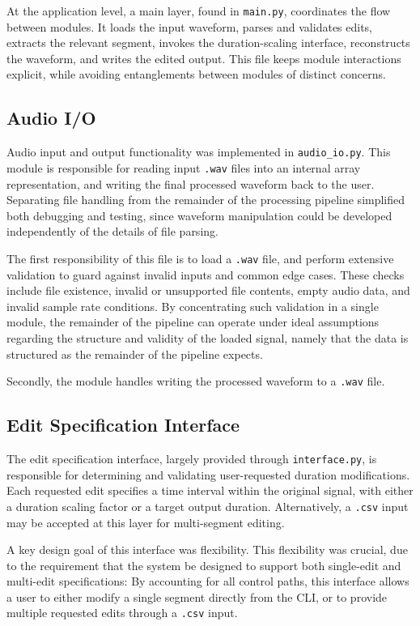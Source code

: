\documentclass{article}
\begin{document}
At the application level, a main layer, found in \texttt{main.py}, coordinates the flow between modules. It loads the input waveform, parses and validates edits, extracts the relevant segment, invokes the duration-scaling interface, reconstructs the waveform, and writes the edited output. This file keeps module interactions explicit, while avoiding entanglements between modules of distinct concerns.

\subsection{Audio I/O}

Audio input and output functionality was implemented in \texttt{audio\_io.py}. This module is responsible for reading input \texttt{.wav} files into an internal array representation, and writing the final processed waveform back to the user. Separating file handling from the remainder of the processing pipeline simplified both debugging and testing, since waveform manipulation could be developed independently of the details of file parsing.

The first responsibility of this file is to load a \texttt{.wav} file, and perform extensive validation to guard against invalid inputs and common edge cases. These checks include file existence, invalid or unsupported file contents, empty audio data, and invalid sample rate conditions. By concentrating such validation in a single module, the remainder of the pipeline can operate under ideal assumptions regarding the structure and validity of the loaded signal, namely that the data is structured as the remainder of the pipeline expects.

Secondly, the module handles writing the processed waveform to a \texttt{.wav} file. 

\subsection{Edit Specification Interface}

The edit specification interface, largely provided through \texttt{interface.py}, is responsible for determining and validating user-requested duration modifications. Each requested edit specifies a time interval within the original signal, with either a duration scaling factor or a target output duration. Alternatively, a \texttt{.csv} input may be accepted at this layer for multi-segment editing.

A key design goal of this interface was flexibility. This flexibility was crucial, due to the requirement that the system be designed to support both single-edit and multi-edit specifications: By accounting for all control paths, this interface allows a user to either modify a single segment directly from the CLI, or to provide multiple requested edits through a \texttt{.csv} input.
\end{document}
